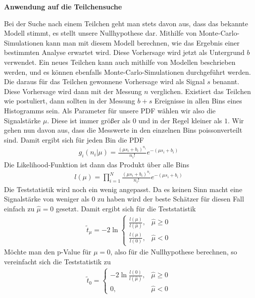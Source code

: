 \textbf{Anwendung auf die Teilchensuche}

Bei der Suche nach einem Teilchen geht man stets davon aus, dass das bekannte Modell stimmt, es stellt unsere Nullhypothese dar.
Mithilfe von Monte-Carlo-Simulationen kann man mit diesem Modell berechnen, wie das Ergebnis einer bestimmten Analyse erwartet wird.
Diese Vorhersage wird jetzt als Untergrund $b$ verwendet.
Ein neues Teilchen kann auch mithilfe von Modellen beschrieben werden, und es können ebenfalls Monte-Carlo-Simulationen durchgeführt werden.
Die daraus für das Teilchen gewonnene Vorhersage wird als Signal $s$ benannt.
Diese Vorhersage wird dann mit der Messung $n$ verglichen.
Existiert das Teilchen wie postuliert, dann sollten in der Messung $b+s$ Ereignisse in allen Bins eines Histogramms sein.
Als Parameter für unsere PDF wählen wir also die Signalstärke $\mu$.
Diese ist immer größer als $0$ und in der Regel kleiner als $1$.
Wir gehen nun davon aus, dass die Messwerte in den einzelnen Bins poissonverteilt sind.
Damit ergibt sich für jeden Bin die PDF
\begin{gather}
	g_{i}(n_{i}|\mu) = \frac{\left ( \mu s_{i}+b_{i}\right)^{n_{i}}}{n_{i}!} e^{-\left ( \mu s_{i}+b_{i}\right)}
\end{gather}
Die Likelihood-Funktion ist dann das Produkt über alle Bins
\begin{gather}
	l(\mu) = \prod_{i=1}^{N} \frac{\left ( \mu s_{i}+b_{i}\right)^{n_{i}}}{n_{i}!} e^{-\left ( \mu s_{i}+b_{i}\right)}
\end{gather}
Die Teststatistik wird noch ein wenig angepasst.
Da es keinen Sinn macht eine Signalstärke von weniger als $0$ zu haben wird der beste Schätzer für diesen Fall einfach zu $\hat{\mu} = 0$ gesetzt. Damit ergibt sich für die Teststatistik
\begin{gather}
	\tilde{t}_{\mu} = -2\ln{}
	\begin{cases}
  	\frac{l(\mu)}{l(\hat{\mu})}, & \hat{\mu} \geq 0 \\
    \frac{l(\mu)}{l(0)}, & \hat{\mu} < 0
  \end{cases}
\end{gather}
Möchte man den p-Value für $\mu = 0$, also für die Nullhypothese berechnen, so vereinfacht sich die Teststatistik zu
\begin{gather}
	\tilde{t}_{0} =
	\begin{cases}
		-2 \ln{\frac{l(0)}{l(\hat{\mu})}}, & \hat{\mu} \geq 0 \\
		0, & \hat{\mu} < 0
	\end{cases}
\end{gather}
